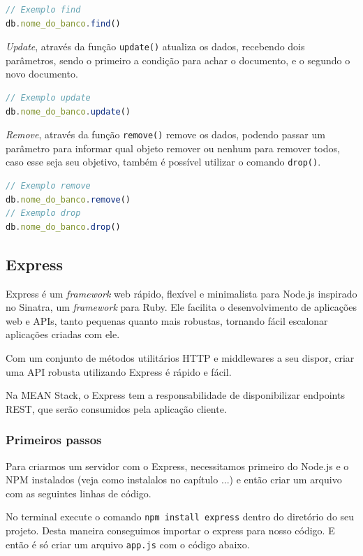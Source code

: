 \documentclass[
	12pt,				%
	openright,			%
	twoside,			%
	a4paper,			%
	english,			%
	brazil				%
	]{abntex2}
\begin{document}
\begin{lstlisting}[language=javascript]
// Exemplo find
db.nome_do_banco.find()
\end{lstlisting}

\textit{Update}, através da função \verb|update()| atualiza os dados, recebendo dois parâmetros, sendo o primeiro a condição para achar o documento, e o segundo o novo documento.

\begin{lstlisting}[language=javascript]
// Exemplo update
db.nome_do_banco.update()
\end{lstlisting}

\textit{Remove}, através da função \verb|remove()| remove os dados, podendo passar um parâmetro para informar qual objeto remover ou nenhum para remover todos, caso esse seja seu objetivo, também é possível utilizar o comando \verb|drop()|.

\begin{lstlisting}[language=javascript]
// Exemplo remove
db.nome_do_banco.remove()
// Exemplo drop
db.nome_do_banco.drop()
\end{lstlisting}


\subsection{Express}

Express é um \textit{framework} web rápido, flexível e minimalista para Node.js inspirado no Sinatra, um \textit{framework} para Ruby. Ele facilita o desenvolvimento de aplicações web e APIs, tanto pequenas quanto mais robustas, tornando fácil escalonar aplicações criadas com ele.

Com um conjunto de métodos utilitários HTTP e middlewares a seu dispor, criar uma API robusta utilizando Express é rápido e fácil.

Na MEAN Stack, o Express tem a responsabilidade de disponibilizar endpoints REST, que serão consumidos pela aplicação cliente.

\subsubsection {Primeiros passos}

Para criarmos um servidor com o Express, necessitamos primeiro do Node.js e o NPM instalados (veja como instalalos no capítulo ...) e então criar um arquivo com as seguintes linhas de código.

No terminal execute o comando \verb|npm install express| dentro do diretório do seu projeto. Desta maneira conseguimos importar o express para nosso código. E então é só criar um arquivo \verb|app.js| com o código abaixo.
\end{document}
